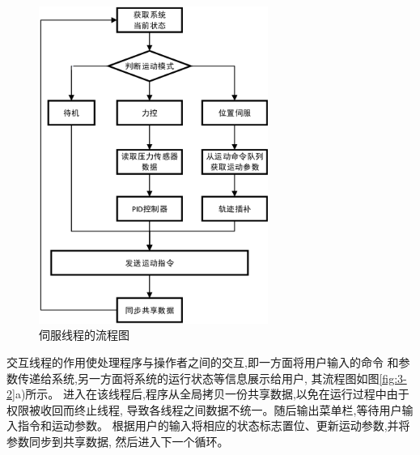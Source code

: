 \begin{figure}[!ht]
  \centering
  \includegraphics[width=7.5cm]{chapter03/pic/3-2-a}
  \caption{伺服线程的流程图\label{fig:servo}}
  \vspace{-0.3cm}
\end{figure}


交互线程的作用使处理程序与操作者之间的交互,即一方面将用户输入的命令
和参数传递给系统,另一方面将系统的运行状态等信息展示给用户,
其流程图如图\ref{fig:3-2}a)所示。
进入在该线程后,程序从全局拷贝一份共享数据,以免在运行过程中由于权限被收回而终止线程,
导致各线程之间数据不统一。随后输出菜单栏,等待用户输入指令和运动参数。
根据用户的输入将相应的状态标志置位、更新运动参数,并将参数同步到共享数据,
然后进入下一个循环。


